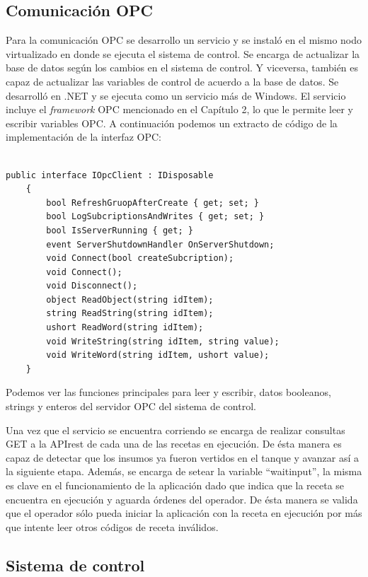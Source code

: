 \subsection{Comunicación OPC}

Para la comunicación OPC se desarrollo un servicio y se instaló en el mismo nodo virtualizado en donde se ejecuta el sistema de control. Se encarga de actualizar la base de datos según los cambios en el sistema de control. Y viceversa, también es capaz de actualizar las variables de control de acuerdo a la base de datos. Se desarrolló en .NET y se ejecuta como un servicio más de Windows. El servicio incluye el \textit{framework} OPC mencionado en el Capítulo 2, lo que le permite leer y escribir variables OPC. A continuación podemos un extracto de código de la implementación de la interfaz OPC:

\begin{lstlisting}[label=cod:vControl,caption=Implementación de la interfaz OPC]  % Start your code-block

public interface IOpcClient : IDisposable
    {
        bool RefreshGruopAfterCreate { get; set; }
        bool LogSubcriptionsAndWrites { get; set; }
        bool IsServerRunning { get; }
        event ServerShutdownHandler OnServerShutdown;
        void Connect(bool createSubcription);
        void Connect();
        void Disconnect();
        object ReadObject(string idItem);
        string ReadString(string idItem);
        ushort ReadWord(string idItem);      
        void WriteString(string idItem, string value);
        void WriteWord(string idItem, ushort value);
    }
\end{lstlisting}

Podemos ver las funciones principales para leer y escribir, datos booleanos, strings y enteros del servidor OPC del sistema de control.

Una vez que el servicio se encuentra corriendo se encarga de realizar consultas GET a la APIrest de cada una de las recetas en ejecución. De ésta manera es capaz de detectar que los insumos ya fueron vertidos en el tanque y avanzar así a la siguiente etapa. Además, se encarga de setear la variable ``waitinput'', la misma es clave en el funcionamiento de la aplicación dado que indica que la receta se encuentra en ejecución y aguarda órdenes del operador. De ésta manera se valida que el operador sólo pueda iniciar la aplicación con la receta en ejecución por más que intente leer otros códigos de receta inválidos. 

\subsection{Sistema de control}

